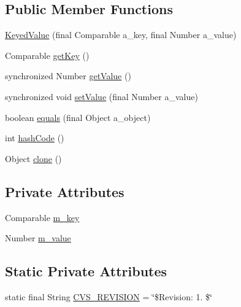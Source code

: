 \subsection*{Public Member Functions}
\begin{DoxyCompactItemize}
\item 
\hyperlink{classorg_1_1jgap_1_1audit_1_1_keyed_value_aa618fc6ef02ebbdde6ca1a07f3b7ee93}{Keyed\-Value} (final Comparable a\-\_\-key, final Number a\-\_\-value)
\item 
Comparable \hyperlink{classorg_1_1jgap_1_1audit_1_1_keyed_value_a14b7ed71d805c8109304b01da0875bf0}{get\-Key} ()
\item 
synchronized Number \hyperlink{classorg_1_1jgap_1_1audit_1_1_keyed_value_ab540af860900b485f14a2d70f4894734}{get\-Value} ()
\item 
synchronized void \hyperlink{classorg_1_1jgap_1_1audit_1_1_keyed_value_a588fb5d5b78e8f0e226dc67f243377aa}{set\-Value} (final Number a\-\_\-value)
\item 
boolean \hyperlink{classorg_1_1jgap_1_1audit_1_1_keyed_value_afde2ddca3048c11edd6a143980907dbc}{equals} (final Object a\-\_\-object)
\item 
int \hyperlink{classorg_1_1jgap_1_1audit_1_1_keyed_value_aa3d037229595795d8bff81dd3f4d84d0}{hash\-Code} ()
\item 
Object \hyperlink{classorg_1_1jgap_1_1audit_1_1_keyed_value_a298a40558e843afa455833520f186d82}{clone} ()
\end{DoxyCompactItemize}
\subsection*{Private Attributes}
\begin{DoxyCompactItemize}
\item 
Comparable \hyperlink{classorg_1_1jgap_1_1audit_1_1_keyed_value_aeb5216693d66e984ff3e0f30194a37c2}{m\-\_\-key}
\item 
Number \hyperlink{classorg_1_1jgap_1_1audit_1_1_keyed_value_ac1f92c83790bcc8f42a78b8adc0d1a64}{m\-\_\-value}
\end{DoxyCompactItemize}
\subsection*{Static Private Attributes}
\begin{DoxyCompactItemize}
\item 
static final String \hyperlink{classorg_1_1jgap_1_1audit_1_1_keyed_value_a4d6139f94a6cd1434621eaf28e15f45d}{C\-V\-S\-\_\-\-R\-E\-V\-I\-S\-I\-O\-N} = \char`\"{}\$Revision\-: 1. \$\char`\"{}
\end{DoxyCompactItemize}
